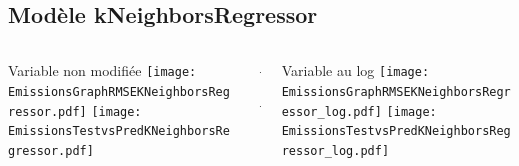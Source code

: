 \documentclass[8pt,aspectratio=169,hyperref={unicode=true}]{beamer}
\begin{document}
\subsection{Modèle kNeighborsRegressor}
\begin{frame}{\insertsubsection}
  \begin{columns}[t]
    \begin{column}{.33\textwidth}
      \centering Variable non modifiée
      \texttt{[image: EmissionsGraphRMSEKNeighborsRegressor.pdf]}
      \texttt{[image: EmissionsTestvsPredKNeighborsRegressor.pdf]}
    \end{column}
    \begin{column}{.33\textwidth}
      $\Longleftarrow$
      \scriptsize
      {\centering
        }
      

      \normalsize
      $\Longleftarrow$

      \raggedleft{$\Longrightarrow$}
      \scriptsize
      {\centering
        }
      

      \normalsize
      \raggedleft{$\Longrightarrow$}
    \end{column}
    \begin{column}{.33\textwidth}
      \centering Variable au log
      \texttt{[image: EmissionsGraphRMSEKNeighborsRegressor\_log.pdf]}
      \texttt{[image: EmissionsTestvsPredKNeighborsRegressor\_log.pdf]}
    \end{column}
  \end{columns}
\end{frame}
\end{document}
